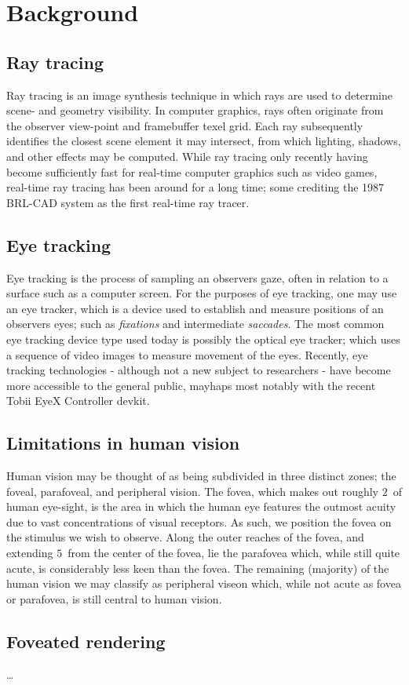 \section{Background}
\subsection{Ray tracing}
Ray tracing is an image synthesis technique in which rays are used to determine scene- and geometry visibility.
In computer graphics, rays often originate from the observer view-point and framebuffer texel grid.
Each ray subsequently identifies the closest scene element it may intersect, from which lighting, shadows, and other effects may be computed.
While ray tracing only recently having become sufficiently fast for real-time computer graphics such as video games, real-time ray tracing has been around for a long time; some crediting the 1987 BRL-CAD system as the first real-time ray tracer\cite{stay87}.

\subsection{Eye tracking}
Eye tracking is the process of sampling an observers gaze, often in relation to a surface such as a computer screen.
For the purposes of eye tracking, one may use an eye tracker, which is a device used to establish and measure positions of an observers eyes\cite{duchowski07}; such as \textit{fixations} and intermediate \textit{saccades}\cite{rayner98}.
The most common eye tracking device type used today is possibly the optical eye tracker; which uses a sequence of video images to measure movement of the eyes\cite{duchowski07}.
Recently, eye tracking technologies - although not a new subject to researchers - have become more accessible to the general public, mayhaps most notably with the recent Tobii EyeX Controller devkit.

\subsection{Limitations in human vision}
Human vision may be thought of as being subdivided in three distinct zones; the foveal, parafoveal, and peripheral vision\cite{rayner98}.
The fovea, which makes out roughly $2$\degree\ of human eye-sight, is the area in which the human eye features the outmost acuity due to vast concentrations of visual receptors.
As such, we position the fovea on the stimulus we wish to observe.
Along the outer reaches of the fovea, and extending $5$\degree\ from the center of the fovea, lie the parafovea which, while still quite acute, is considerably less keen than the fovea.
The remaining (majority) of the human vision we may classify as peripheral viseon which, while not acute as fovea or parafovea, is still central to human vision.

\subsection{Foveated rendering}
\ldots

